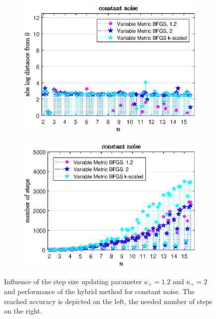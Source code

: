 \begin{figure}[ht]%
	\begin{subfigure}{0.49\textwidth}
		\includegraphics[width=\textwidth]{Pictures/Plots/constant_noise_comp.eps}%
	\end{subfigure}%
	\hfill
	\begin{subfigure}{0.49\textwidth}
		\includegraphics[width=\textwidth]{Pictures/Plots/steps_constant_noise_comp.eps}%
	\end{subfigure}
	\caption[Influence of the step size updating parameter and hybrid method: constant noise]{Influence of the step size updating parameter \(\kappa_+ = 1.2\) and \(\kappa_+ =2 \) and performance of the hybrid method for constant noise. The reached accuracy is depicted on the left, the needed number of steps on the right.}
	\label{fig_const_noise_comp}
\end{figure}


